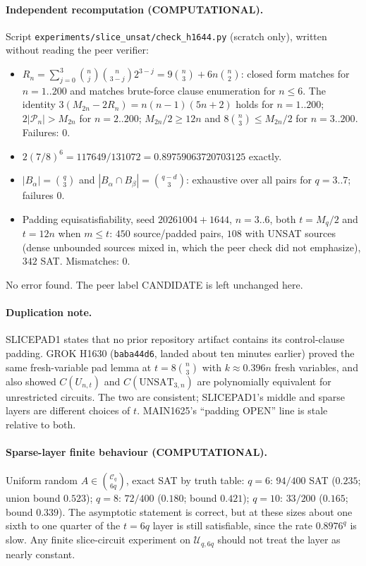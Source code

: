 \documentclass[11pt]{article}
\begin{document}
\paragraph{Independent recomputation (COMPUTATIONAL).} Script \texttt{experiments/slice\_unsat/check\_h1644.py}
(scratch only), written without reading the peer verifier:
\begin{itemize}
\item $R_n=\sum_{j=0}^3\binom nj\binom n{3-j}2^{3-j}=9\binom n3+6n\binom n2$: closed form matches for $n=1..200$ and
matches brute-force clause enumeration for $n\le6$. The identity $3(M_{2n}-2R_n)=n(n-1)(5n+2)$ holds for $n=1..200$;
$2|\mathcal P_n|>M_{2n}$ for $n=2..200$; $M_{2n}/2\ge12n$ and $8\binom n3\le M_{2n}/2$ for $n=3..200$. Failures: $0$.
\item $2(7/8)^6=117649/131072=0.89759063720703125$ exactly.
\item $|B_\alpha|=\binom q3$ and $|B_\alpha\cap B_\beta|=\binom{q-d}3$: exhaustive over all pairs for $q=3..7$; failures $0$.
\item Padding equisatisfiability, seed $20261004{+}1644$, $n=3..6$, both $t=M_q/2$ and $t=12n$ when $m\le t$:
$450$ source/padded pairs, $108$ with UNSAT sources (dense unbounded sources mixed in, which the peer check did not
emphasize), $342$ SAT. Mismatches: $0$.
\end{itemize}
No error found. The peer label CANDIDATE is left unchanged here.

\paragraph{Duplication note.} SLICEPAD1 states that no prior repository artifact contains its control-clause padding.
GROK H1630 (\texttt{baba44d6}, landed about ten minutes earlier) proved the same fresh-variable pad lemma at
$t=8\binom n3$ with $k\approx0.396n$ fresh variables, and also showed $C(U_{n,t})$ and $C(\mathrm{UNSAT}_{3,n})$ are
polynomially equivalent for unrestricted circuits. The two are consistent; SLICEPAD1's middle and sparse layers are
different choices of $t$. MAIN1625's ``padding OPEN'' line is stale relative to both.

\paragraph{Sparse-layer finite behaviour (COMPUTATIONAL).} Uniform random $A\in\binom{\mathcal C_q}{6q}$, exact SAT by
truth table: $q=6$: $94/400$ SAT ($0.235$; union bound $0.523$); $q=8$: $72/400$ ($0.180$; bound $0.421$); $q=10$:
$33/200$ ($0.165$; bound $0.339$). The asymptotic statement is correct, but at these sizes about one sixth to one quarter
of the $t=6q$ layer is still satisfiable, since the rate $0.8976^q$ is slow. Any finite slice-circuit experiment on
$\mathcal U_{q,6q}$ should not treat the layer as nearly constant.
\end{document}
